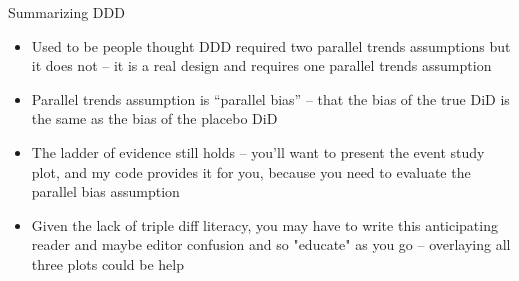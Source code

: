\documentclass[aspectratio=169,11pt]{beamer}
\begin{document}
\begin{frame}{Summarizing DDD}

\begin{itemize}
\item Used to be people thought DDD required two parallel trends assumptions but it does not -- it is a real design and requires one parallel trends assumption
\item Parallel trends assumption is ``parallel bias'' -- that the bias of the true DiD is the same as the bias of the placebo DiD
\item The ladder of evidence still holds -- you'll want to present the event study plot, and my code provides it for you, because you need to evaluate the parallel bias assumption
\item Given the lack of triple diff literacy, you may have to write this anticipating reader and maybe editor confusion and so "educate" as you go -- overlaying all three plots could be help

\end{itemize}

\end{frame}
\end{document}

